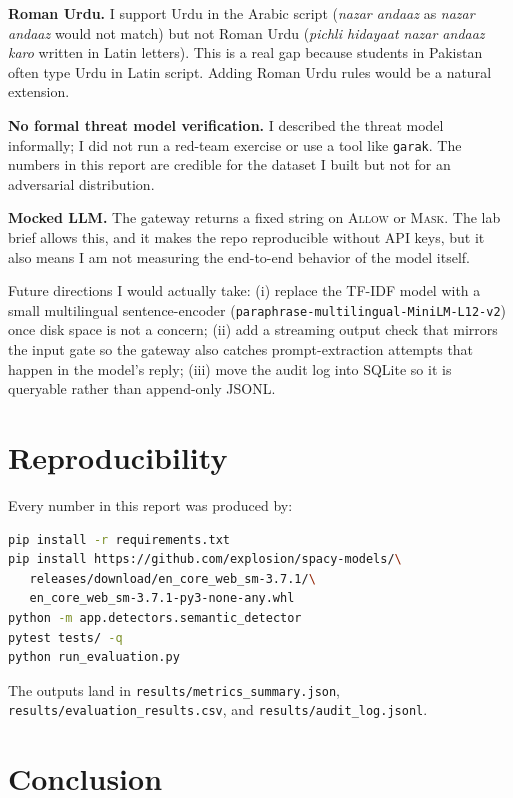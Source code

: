 \documentclass[conference]{IEEEtran}
\begin{document}
\textbf{Roman Urdu.} I support Urdu in the Arabic script (\emph{nazar
andaaz} as \emph{nazar andaaz} would not match) but not Roman Urdu
(\emph{pichli hidayaat nazar andaaz karo} written in Latin letters).
This is a real gap because students in Pakistan often type Urdu in
Latin script. Adding Roman Urdu rules would be a natural extension.

\textbf{No formal threat model verification.} I described the threat
model informally; I did not run a red-team exercise or use a tool like
\texttt{garak}. The numbers in this report are credible for the dataset
I built but not for an adversarial distribution.

\textbf{Mocked LLM.} The gateway returns a fixed string on \textsc{Allow}
or \textsc{Mask}. The lab brief allows this, and it makes the repo
reproducible without API keys, but it also means I am not measuring the
end-to-end behavior of the model itself.

Future directions I would actually take: (i) replace the TF-IDF model
with a small multilingual sentence-encoder (\texttt{paraphrase-multilingual-MiniLM-L12-v2}) once disk space is not a concern; (ii) add a
streaming output check that mirrors the input gate so the gateway also
catches prompt-extraction attempts that happen in the model's reply;
(iii) move the audit log into SQLite so it is queryable rather than
append-only JSONL.

\section{Reproducibility}

Every number in this report was produced by:

\begin{lstlisting}[language=bash]
pip install -r requirements.txt
pip install https://github.com/explosion/spacy-models/\
   releases/download/en_core_web_sm-3.7.1/\
   en_core_web_sm-3.7.1-py3-none-any.whl
python -m app.detectors.semantic_detector
pytest tests/ -q
python run_evaluation.py
\end{lstlisting}

The outputs land in \texttt{results/metrics\_summary.json},
\texttt{results/evaluation\_results.csv}, and
\texttt{results/audit\_log.jsonl}.

\section{Conclusion}
\end{document}
